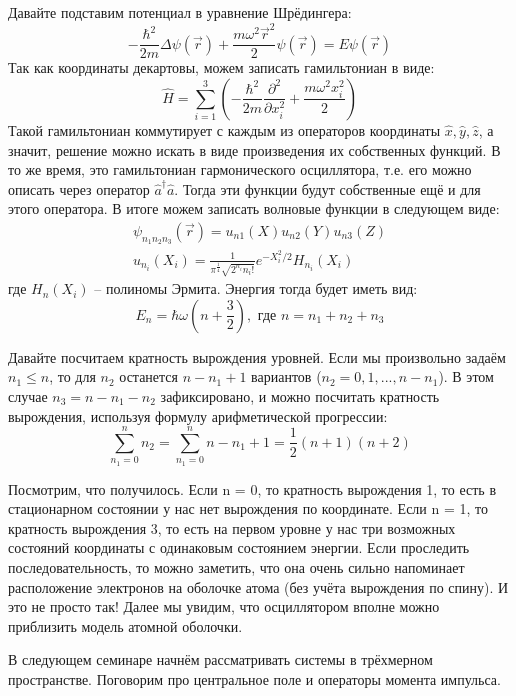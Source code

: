 Давайте подставим потенциал в уравнение Шрёдингера:
\[
-\frac{\hbar^2}{2m}\Delta\psi(\vec{r}) + \frac{m\omega^2\vec{r}^2}{2}\psi(\vec{r}) = E\psi(\vec{r})
\]
Так как координаты декартовы, можем записать гамильтониан в виде:
\[
\hat H = \sum\limits_{i=1}^3(-\frac{\hbar^2}{2m}\frac{\partial^2}{\partial x_i^2} + \frac{m\omega^2x_i^2}{2})
\]
Такой гамильтониан коммутирует с каждым из операторов координаты $\hat{x}, \hat{y}, \hat{z}$, а значит, решение можно искать в виде произведения их собственных функций. В то же время, это гамильтониан гармонического осциллятора, т.е. его можно описать через оператор $\hat{a}^{\dagger}\hat{a}$. Тогда эти функции будут собственные ещё и для этого оператора. В итоге можем записать волновые функции в следующем виде:
\begin{gather*}
\psi_{n_1n_2n_3}(\vec{r}) = u_{n1}(X)u_{n2}(Y)u_{n3}(Z)\\
u_{n_i}(X_i) = \frac{1}{\pi^{\frac{1}{4}}\sqrt{2^{n_i}n_i!}}e^{-X_i^2/2}H_{n_i}(X_i)
\end{gather*}
где $H_{n}(X_i)$ -- полиномы Эрмита. Энергия тогда будет иметь вид:
\[
E_n = \hbar\omega(n+\frac{3}{2}), \text{ где } n = n_1 + n_2 + n_3
\]

Давайте посчитаем кратность вырождения уровней. Если мы произвольно задаём \\$n_1 \leq n$, то для $n_2$ останется $n-n_1+1$ вариантов ($n_2 = 0, 1, ... ,n - n_1$). В этом случае $n_3 = n - n_1 - n_2$ зафиксировано, и можно посчитать кратность вырождения, используя формулу арифметической прогрессии: 
\[
\sum\limits_{n_1 = 0}^n n_2 = \sum\limits_{n_1 = 0}^n n-n_1 + 1 = \frac{1}{2}(n+1)(n+2)
\]

Посмотрим, что получилось. Если n = 0, то кратность вырождения 1, то есть в стационарном состоянии у нас нет вырождения по координате. Если n = 1, то кратность вырождения 3, то есть на первом уровне у нас три возможных состояний координаты с одинаковым состоянием энергии. Если проследить последовательность, то можно заметить, что она очень сильно напоминает расположение электронов на оболочке атома (без учёта вырождения по спину). И это не просто так! Далее мы увидим, что осциллятором вполне можно приблизить модель атомной оболочки.

В следующем семинаре начнём рассматривать системы в трёхмерном пространстве. Поговорим про центральное поле и операторы момента импульса.

